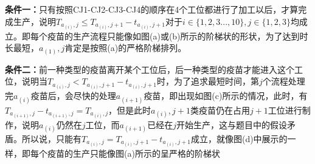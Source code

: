\documentclass{ctexart}
\begin{document}
\textbf{条件一：}只有按照CJ1-CJ2-CJ3-CJ4的顺序在4个工位都进行了加工以后，才算完成生产，说明$T_{a_{(i)},j} \leq T_{a_{(i)},j+1}-t_{a_{(i)},j+1}$对于$i \in \{ 1,2,3...,10\},j\in \{ 1,2,3\}$均成立。即每个疫苗的生产流程只能像如图(a)或(b)所示的阶梯状的形状，为了达到时长最短，$a_{(1)},j$肯定是按照(a)的严格阶梯排列。\par
\begin{figure}[h]  
	\centering
	\quad
	\label{条件}
\end{figure}
\textbf{条件二：}前一种类型的疫苗离开某个工位后，后一种类型的疫苗才能进入这个工位，说明当$T_{a_{(i)},j} < T_{a_{(i)},j+1}-t_{a_{(i)},j+1}$时，为了追求最短时间，第$j$个流程处理完$a_{(i)}$疫苗后，会尽快的处理$a_{(i+1)}$疫苗，即出现如图(c)所示的情况，此时，有$T_{a_{(i+1)},j}-t_{a_{(i+1)},j} =  T_{a_{(i)},j}$，但是此时$a_{(i)},j+1$类疫苗仍在占用$j+1$工位进行制作，说明$a_{(i)}$仍然在$j$工位，而$a_{(i+1)}$已经在$j$开始生产，这与题目中的假设矛盾。所以说，只能有$T_{a_{(i)},j} = T_{a_{(i)},j+1}-t_{a_{(i)},j+1}$成立，就像图(d)中展示的一样，即每个疫苗的生产只能像图(a)所示的呈严格的阶梯状
\begin{figure}[h]  
	\centering
	\quad
\end{figure}
\end{document}
